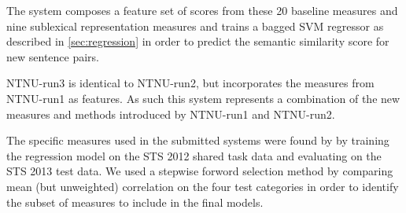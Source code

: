 The system composes a feature set of scores from these 20 baseline measures and nine sublexical representation measures and trains a bagged SVM regressor as described in \ref{sec:regression} in order to predict the semantic similarity score for new sentence pairs.

NTNU-run3 is identical to NTNU-run2, but incorporates the measures from NTNU-run1 as features. As such this system represents a combination of the new measures and methods introduced by NTNU-run1 and NTNU-run2.


The specific measures used in the submitted systems were found by by training the regression model on the STS 2012 shared task data and evaluating on the STS 2013 test data. We used a stepwise forword selection method by comparing mean (but unweighted) correlation on the four test categories in order to identify the subset of measures to include in the final models.


